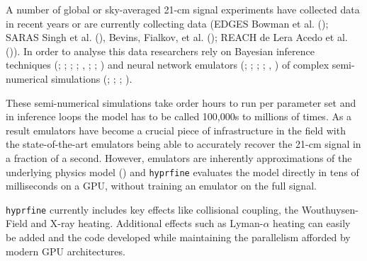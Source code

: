 \documentclass[
]{article}
\begin{document}
A number of global or sky-averaged 21-cm signal experiments have
collected data in recent years or are currently collecting data (EDGES
Bowman et al. (); SARAS Singh et al.
(), Bevins, Fialkov, et al.
(); REACH de Lera Acedo et al.
()). In order to analyse this data
researchers rely on Bayesian inference techniques
(;
;
;
;
,
;
;
) and neural
network emulators (; ;
;
;
,
) of complex semi-numerical
simulations (; ;
;
).

These semi-numerical simulations take order hours to run per parameter
set and in inference loops the model has to be called 100,000s to
millions of times. As a result emulators have become a crucial piece of
infrastructure in the field with the state-of-the-art emulators being
able to accurately recover the 21-cm signal in a fraction of a second.
However, emulators are inherently approximations of the underlying
physics model () and \texttt{hyprfine} evaluates the model directly in tens of
milliseconds on a GPU, without training an emulator on the full signal.

\texttt{hyprfine} currently includes key effects like collisional
coupling, the Wouthuysen-Field and X-ray heating. Additional effects
such as Lyman-\(\alpha\) heating can easily be added and the code
developed while maintaining the parallelism afforded by modern GPU
architectures.
\end{document}
